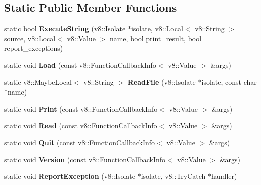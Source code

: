 \subsection*{Static Public Member Functions}
\begin{DoxyCompactItemize}
\item 
\mbox{\label{classv8Shell_ad6f8824f82ad9d65b6628cf2638aed2e}} 
static bool {\bfseries Execute\+String} (v8\+::\+Isolate $\ast$isolate, v8\+::\+Local$<$ v8\+::\+String $>$ source, v8\+::\+Local$<$ v8\+::\+Value $>$ name, bool print\+\_\+result, bool report\+\_\+exceptions)
\item 
\mbox{\label{classv8Shell_a42f39e84a85a5569b51a383ff3040844}} 
static void {\bfseries Load} (const v8\+::\+Function\+Callback\+Info$<$ v8\+::\+Value $>$ \&args)
\item 
\mbox{\label{classv8Shell_a03ba2e9fa89d5b5be2c0628401578380}} 
static v8\+::\+Maybe\+Local$<$ v8\+::\+String $>$ {\bfseries Read\+File} (v8\+::\+Isolate $\ast$isolate, const char $\ast$name)
\item 
\mbox{\label{classv8Shell_a978273099b602ea7a88f26b9424d2b20}} 
static void {\bfseries Print} (const v8\+::\+Function\+Callback\+Info$<$ v8\+::\+Value $>$ \&args)
\item 
\mbox{\label{classv8Shell_a3889864df9a4aab90b1c0428bc1e62c4}} 
static void {\bfseries Read} (const v8\+::\+Function\+Callback\+Info$<$ v8\+::\+Value $>$ \&args)
\item 
\mbox{\label{classv8Shell_a8dfdbfca32f8a9917c8e9774fcd37b6d}} 
static void {\bfseries Quit} (const v8\+::\+Function\+Callback\+Info$<$ v8\+::\+Value $>$ \&args)
\item 
\mbox{\label{classv8Shell_a1020b0a431e68eb23fae27c92d4a4f33}} 
static void {\bfseries Version} (const v8\+::\+Function\+Callback\+Info$<$ v8\+::\+Value $>$ \&args)
\item 
\mbox{\label{classv8Shell_ab1a7bd37f1e933f0ab45f81ebbca0c44}} 
static void {\bfseries Report\+Exception} (v8\+::\+Isolate $\ast$isolate, v8\+::\+Try\+Catch $\ast$handler)
\end{DoxyCompactItemize}
